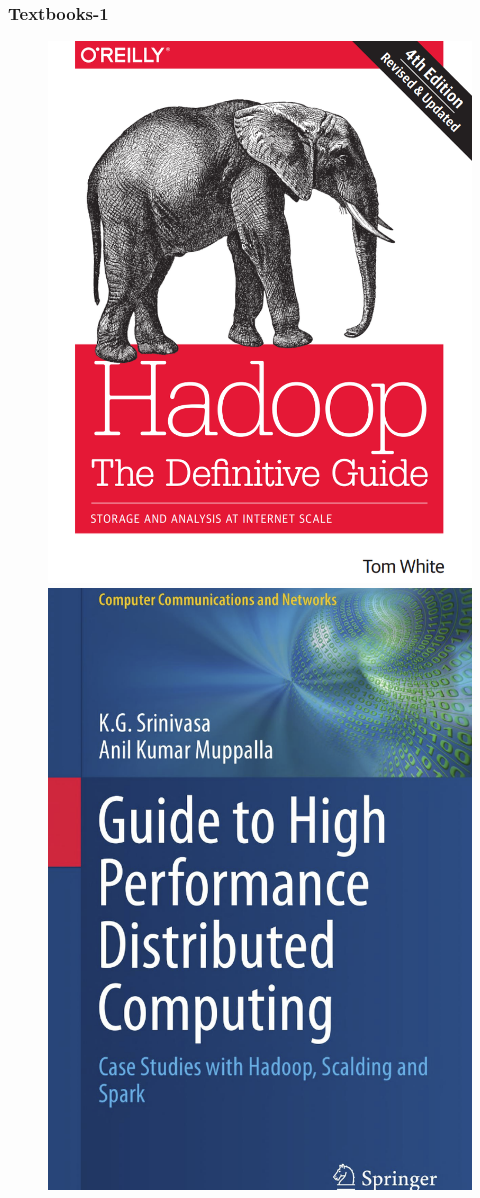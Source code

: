\begin{frame}[c]
\frametitle{Textbooks-1}
\begin{figure}[ht]
	\begin{minipage}[c][1\width]{
				0.4\textwidth}
			\centering
		\includegraphics[width=.8\linewidth,height=.7\textheight]{./Figures/chapter-00/hadoop-tdg.png}
	\end{minipage}
	\hfill
	\begin{minipage}[c][1\width]{
				0.4\textwidth}
			\centering
		\includegraphics[width=.8\linewidth,height=.7\textheight]{./Figures/chapter-00/high-performance-computing.png}

\end{minipage}
\end{figure}
\end{frame}
